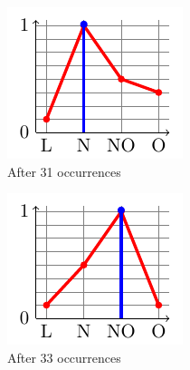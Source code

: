 \begin{figure}
\begin{subfigure}[b]{.15\linewidth}
\includegraphics[width=\linewidth]{plot_tikz/speed31.pdf}
\caption{After 31 occurrences}
\label{fig:m}
\end{subfigure}
\begin{subfigure}[b]{.15\linewidth}
\includegraphics[width=\linewidth]{plot_tikz/speed33.pdf}
\caption{After 33 occurrences}
\label{fig:o}
\end{subfigure}
\begin{subfigure}[b]{.15\linewidth}

\end{subfigure}
\end{figure}
